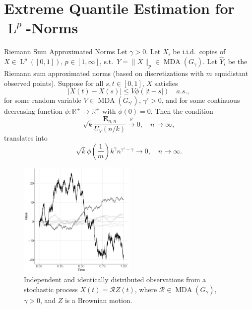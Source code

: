 \documentclass[11pt, aspectratio=169]{beamer}
\DeclareMathOperator{\mda}{MDA}
\DeclareMathOperator{\lp}{L}
\begin{document}
\section{Extreme Quantile Estimation for $\lp^p$-Norms}


\begin{frame}{Riemann Sum Approximated Norms}
  Let $\gamma > 0$. Let $X_i$ be i.i.d.\ copies of $X\in
  \lp^p\left([0,1]\right)$, $p\in [1,\infty]$, s.t.\ $Y =
  \|X\|_p\in\mda\left(G_\gamma\right)$. Let $\hat Y_i$ be the Riemann sum
  approximated norms (based on discretizations with $m$ equidistant observed
  points). Suppose for all $s,t\in [0,1]$, $X$ satisfies
  \begin{equation*}
    \left|X(t) - X(s)\right| \leq V\phi\left(|t-s|\right) \quad a.s.,
  \end{equation*}
  for some random variable $V\in\mda\left(G_{\gamma'}\right)$, $\gamma' > 0$,
  and for some continuous decreasing function $\phi:\mathbb{R}^+\to
  \mathbb{R}^+$ with $\phi\left(0\right) = 0$.
  \pause
  Then the condition
  \begin{equation*}
    \sqrt{k}\frac{\bm E_{n,n}}{U_Y\left(n/k\right)}\stackrel{\mathbb{P}}{\to}0,
    \quad n\to\infty,
  \end{equation*}
  translates into
  \begin{equation*}
    \sqrt{k}\phi\left(\frac{1}{m}\right)k^\gamma n^{\gamma' - \gamma}\to 0,
    \quad n\to\infty.
  \end{equation*}
\end{frame}


\begin{frame}
  \begin{figure}
    \centering
    \includegraphics[width = 0.5\textwidth]{functional}
    \caption{Independent and identically distributed observations from a
    stochastic process $X(t) = \mathcal{R}Z(t)$, where
    $\mathcal{R}\in\mda\left(G_\gamma\right)$, $\gamma > 0$, and $Z$ is a
    Brownian motion.}
  \end{figure}
\end{frame}
\end{document}

